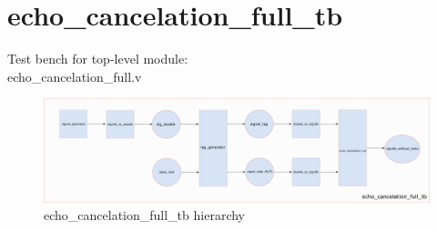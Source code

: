 \documentclass[twoside,a4paper]{refart}
\begin{document}
\section{echo\_cancelation\_full\_tb}
Test bench for top-level module:\\
echo\_cancelation\_full.v\\
\begin{figure}[H]
	\centering
	\includegraphics[scale=0.7]{echo_cancelation_full_tb.png}
	\caption{echo\_cancelation\_full\_tb hierarchy}
	\label{}
\end{figure}



\printindex
\end{document}
